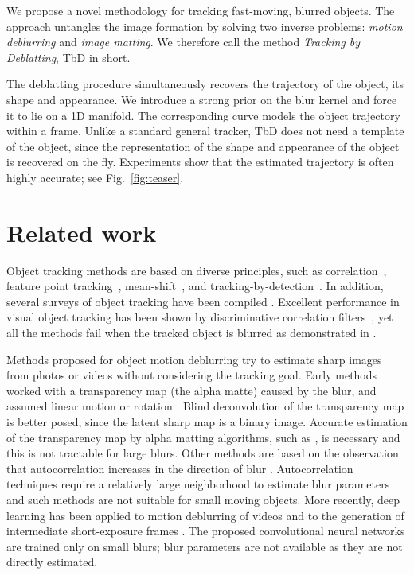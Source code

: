 \documentclass[10pt,twocolumn,letterpaper]{article}
\begin{document}
We propose a novel methodology for tracking fast-moving,
blurred objects.
The approach untangles the image formation by solving two inverse problems: {\it motion deblurring} and {\it image matting}.
We therefore call the method   \emph{Tracking by Deblatting}, TbD in short. 

The deblatting procedure simultaneously recovers the trajectory of the object, its shape and appearance. 
We introduce a strong prior on the blur kernel and force it to lie on a 1D manifold.   
The corresponding curve models the object trajectory within a frame.
Unlike a standard general tracker, TbD does not need a template of the object, since the representation of the shape and appearance of the object is recovered on the fly.
Experiments show that the estimated trajectory is often highly accurate; see Fig.~\ref{fig:teaser}.



\section{Related work}
\label{sec:Rel}
 
Object tracking methods are based on diverse principles, such as correlation~\cite{Biresaw:2015:CST:2729305.2741247,dsst,srdcf,csrdcf,Tang2018}, feature point tracking~\cite{tomasi1991detection}, mean-shift~\cite{Comaniciu:2003:KOT:776753.776799,asms}, and tracking-by-detection~\cite{meem,struck}. In addition, several surveys of object tracking have been compiled \cite{Avidan:2007:ET:1191552.1191804,5674053,Godec:2013:HTN:2527401.2527616}. Excellent performance in visual object tracking has been shown by discriminative correlation filters~\cite{Biresaw:2015:CST:2729305.2741247,dsst,srdcf,csrdcf}, yet all the methods fail when the tracked object is blurred as demonstrated in \cite{fmo}. 



Methods proposed for object motion deblurring try to estimate sharp images from photos or videos without considering the tracking goal. Early methods worked with a transparency map (the alpha matte) caused by the blur, and assumed linear motion \cite{Jia2007,daiwu:08} or rotation \cite{Shan2007}. Blind deconvolution of the transparency map is better posed, since the latent sharp map is a binary image.
Accurate estimation of the transparency map by alpha matting algorithms, such as \cite{Levin2008}, is necessary and this is not tractable for large blurs.
Other methods are based on the observation that autocorrelation increases in the direction of blur \cite{Kim2014,Sun2015}. Autocorrelation techniques require a relatively large neighborhood to estimate blur parameters and such methods are not suitable for small moving objects.
More recently, deep learning has been applied to motion deblurring of videos \cite{Wieschollek2017,Su2017} and to the generation of intermediate short-exposure frames \cite{Jin2018}. The proposed convolutional neural networks are trained only on small blurs; blur parameters are not available as they are not directly estimated. 
\end{document}
